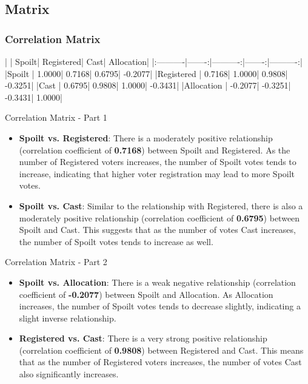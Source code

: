 \documentclass{beamer}
\begin{document}
\subsection{Matrix}

\begin{frame}[fragile]
\frametitle{Correlation Matrix}
\begin{Schunk}
\begin{Soutput}
|           |  Spoilt| Registered|    Cast| Allocation|
|:----------|-------:|----------:|-------:|----------:|
|Spoilt     |  1.0000|     0.7168|  0.6795|    -0.2077|
|Registered |  0.7168|     1.0000|  0.9808|    -0.3251|
|Cast       |  0.6795|     0.9808|  1.0000|    -0.3431|
|Allocation | -0.2077|    -0.3251| -0.3431|     1.0000|
\end{Soutput}
\end{Schunk}
\end{frame}

\begin{frame}{Correlation Matrix - Part 1}
\begin{itemize}
\item \textbf{Spoilt vs. Registered}: There is a moderately positive relationship (correlation coefficient of \textbf{0.7168}) between Spoilt and Registered. As the number of Registered voters increases, the number of Spoilt votes tends to increase, indicating that higher voter registration may lead to more Spoilt votes.
\item \textbf{Spoilt vs. Cast}: Similar to the relationship with Registered, there is also a moderately positive relationship (correlation coefficient of \textbf{0.6795}) between Spoilt and Cast. This suggests that as the number of votes Cast increases, the number of Spoilt votes tends to increase as well.
\end{itemize}
\end{frame}

\begin{frame}{Correlation Matrix - Part 2}
\begin{itemize}
\item \textbf{Spoilt vs. Allocation}: There is a weak negative relationship (correlation coefficient of \textbf{-0.2077}) between Spoilt and Allocation. As Allocation increases, the number of Spoilt votes tends to decrease slightly, indicating a slight inverse relationship.
\item \textbf{Registered vs. Cast}: There is a very strong positive relationship (correlation coefficient of \textbf{0.9808}) between Registered and Cast. This means that as the number of Registered voters increases, the number of votes Cast also significantly increases.
\end{itemize}
\end{frame}
\end{document}
